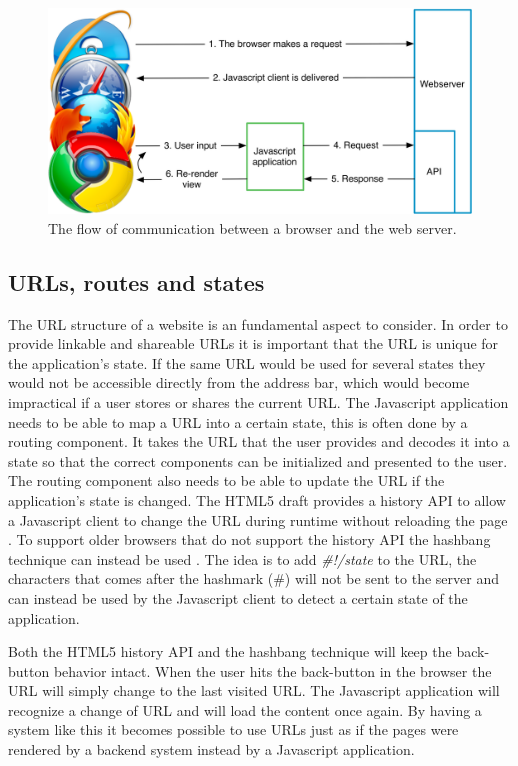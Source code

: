 \begin{figure}[h!]
	\centerline{\includegraphics[width=150mm]{gfx/flow.png}}
	\caption{The flow of communication between a browser and the web server.}
	\label{fig:flow}
\end{figure}

\subsection{URLs, routes and states}
The URL structure of a website is an fundamental aspect to consider. In order to provide linkable and shareable URLs it is important that the URL is unique for the application's state. If the same URL would be used for several states they would not be accessible directly from the address bar, which would become impractical if a user stores or shares the current URL. The Javascript application needs to be able to map a URL into a certain state, this is often done by a routing component. It takes the URL that the user provides and decodes it into a state so that the correct components can be initialized and presented to the user. The routing component also needs to be able to update the URL if the application's state is changed. The HTML5 draft provides a history API to allow a Javascript client to change the URL during runtime without reloading the page \cite{w3c_history}. To support older browsers that do not support the history API the hashbang technique can instead be used \cite{html5_missing_manual}. The idea is to add {\em \#!/state} to the URL, the characters that comes after the hashmark (\#) will not be sent to the server and can instead be used by the Javascript client to detect a certain state of the application.

Both the HTML5 history API and the hashbang technique will keep the back-button behavior intact. When the user hits the back-button in the browser the URL will simply change to the last visited URL. The Javascript application will recognize a change of URL and will load the content once again. By having a system like this it becomes possible to use URLs just as if the pages were rendered by a backend system instead by a Javascript application.

